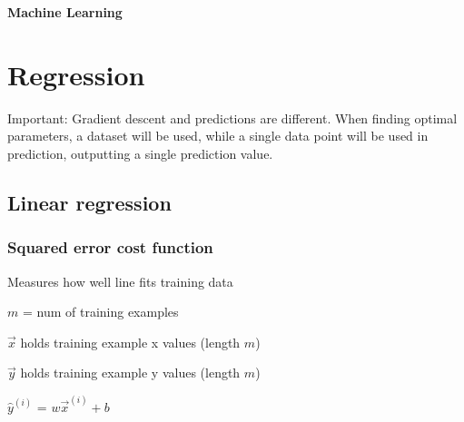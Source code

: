 \documentclass[12pt]{article}
\begin{document}
\newcommand*\dif{\mathop{}\!\mathrm{d}}

\newenvironment{myitemize}
{ \begin{itemize}
    \setlength{\itemsep}{0pt}
    \setlength{\parskip}{0pt}
    \setlength{\parsep}{0pt}     }
{ \end{itemize}                  } 

\newenvironment{myenumerate}
{ \begin{enumerate}
    \setlength{\itemsep}{0pt}
    \setlength{\parskip}{0pt}
    \setlength{\parsep}{0pt}     }
{ \end{enumerate}                  } 

\begin{titlepage}
\begin{center}
\vspace*{2cm}
\begin{huge}\textbf{Machine Learning}\end{huge}
\end{center}
\end{titlepage}

\tableofcontents


\pagebreak

\section{Regression}

Important: Gradient descent and predictions are different. When finding optimal parameters, a dataset will be used, while a single data point will be used in prediction, outputting a single prediction value.

\subsection{Linear regression}
\subsubsection{Squared error cost function}

Measures how well line fits training data

$m$ = num of training examples

$\vec{x}$ holds training example x values (length $m$)

$\vec{y}$ holds training example y values (length $m$)

${\hat y}^{(i)}$ = $w\vec{x}^{(i)} + b$
\end{document}
